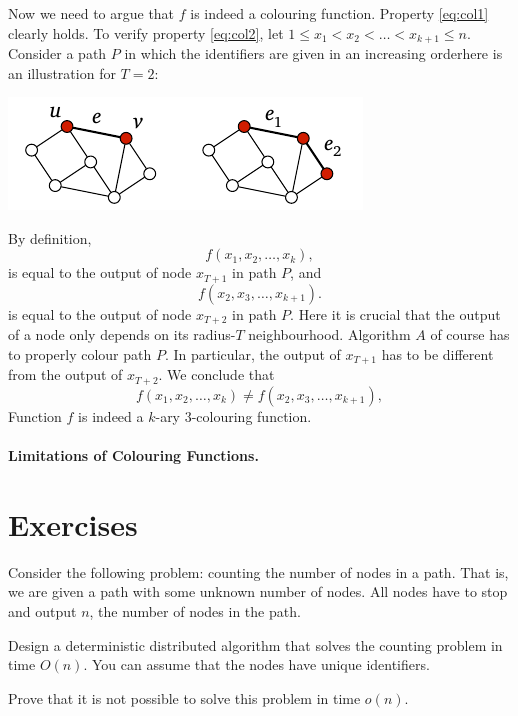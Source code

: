 Now we need to argue that $f$ is indeed a colouring function. Property \eqref{eq:col1} clearly holds. To verify property \eqref{eq:col2}, let $1 \le x_1 < x_2 < \dotso < x_{k+1} \le n$. Consider a path $P$ in which the identifiers are given in an increasing order\mydash here is an illustration for $T = 2$:
\begin{center}
    \includegraphics[page=\PIntroIdIncrB]{figs.pdf}
\end{center}
By definition,
\[
    f(x_1, x_2, \dotsc, x_k),
\]
is equal to the output of node $x_{T+1}$ in path $P$, and
\[
    f(x_2, x_3, \dotsc, x_{k+1}).
\]
is equal to the output of node $x_{T+2}$ in path $P$. Here it is crucial that the output of a node only depends on its radius-$T$ neighbourhood. Algorithm $A$ of course has to properly colour path $P$. In particular, the output of $x_{T+1}$ has to be different from the output of $x_{T+2}$. We conclude that
\[
    f(x_1, x_2, \dotsc, x_k) \ne f(x_2, x_3, \dotsc, x_{k+1}),
\]
Function $f$ is indeed a $k$-ary $3$-colouring function.


\paragraph{Limitations of Colouring Functions.}




\section{Exercises}

\begin{ex}[counting]
    Consider the following problem: counting the number of nodes in a path. That is, we are given a path with some unknown number of nodes. All nodes have to stop and output $n$, the number of nodes in the path.
    \begin{subex}
        \item Design a deterministic distributed algorithm that solves the counting problem in time $O(n)$. You can assume that the nodes have unique identifiers.
        \item Prove that it is not possible to solve this problem in time $o(n)$.
    \end{subex}
\end{ex}


